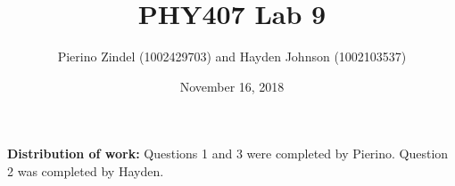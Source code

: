 \documentclass{article}
\title{PHY407 Lab 9}
\author{Pierino Zindel (1002429703) and Hayden Johnson (1002103537)}
\date{November 16, 2018}
\begin{document}
\maketitle

\noindent \textbf{Distribution of work:} Questions 1 and 3 were completed by Pierino. Question 2 was completed by Hayden.
\end{document}
